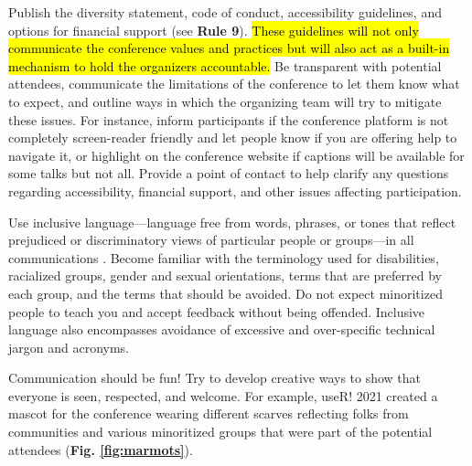 \documentclass[10pt,letterpaper]{article}
\begin{document}
Publish the diversity statement, code of conduct, accessibility guidelines, and options for financial support (see \textbf{Rule 9}).
\hl{These guidelines will not only communicate the conference values and practices but will also act as a built-in mechanism to hold the organizers accountable.}
Be transparent with potential attendees, communicate the limitations of the conference to let them know what to expect, and outline ways in which the organizing team will try to mitigate these issues. 
For instance, inform participants if the conference platform is not completely screen-reader friendly and let people know if you are offering help to navigate it, or highlight on the conference website if captions will be available for some talks but not all.
Provide a point of contact to help clarify any questions regarding accessibility, financial support, and other issues affecting participation.

Use inclusive language---language free from words, phrases, or tones that reflect prejudiced or discriminatory views of particular people or groups---in all communications \cite{hallDesigningDiversityInclusion2019}. 
Become familiar with the terminology used for disabilities, racialized groups, gender and sexual orientations, terms that are preferred by each group, and the terms that should be avoided.
Do not expect minoritized people to teach you and accept feedback without being offended.
Inclusive language also encompasses avoidance of excessive and over-specific technical jargon and acronyms. 

Communication should be fun! Try to develop creative ways to show that everyone is seen, respected, and welcome. 
For example, useR! 2021 created a mascot for the conference wearing different scarves reflecting folks from communities and various minoritized groups that were part of the potential attendees (\textbf{Fig. \ref{fig:marmots}}). 
\end{document}
